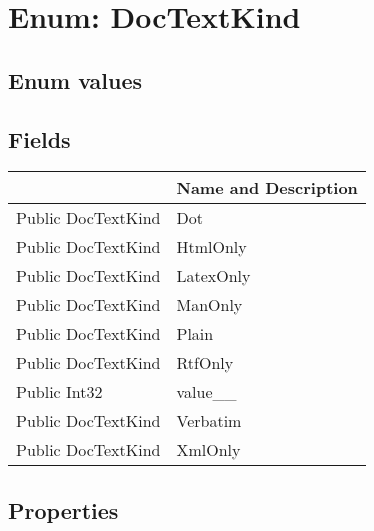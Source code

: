 \documentclass[11pt, oneside, a4paper]{book}
\begin{document}
\section{Enum: DocTextKind}

\subsection{Enum values}

\subsection{Fields}
\begin{center}
\begin{tabular}{| p{3cm} | p{12cm} | }
\hline
\textbf{ } & \textbf{ Name and Description}\\
\hline
 Public  DocTextKind &  Dot\hypertarget{SoftwareEngineeringTools.{}Documentation.{}DocTextKind.{}Dot}{}\\
\hline
 Public  DocTextKind &  HtmlOnly\hypertarget{SoftwareEngineeringTools.{}Documentation.{}DocTextKind.{}HtmlOnly}{}\\
\hline
 Public  DocTextKind &  LatexOnly\hypertarget{SoftwareEngineeringTools.{}Documentation.{}DocTextKind.{}LatexOnly}{}\\
\hline
 Public  DocTextKind &  ManOnly\hypertarget{SoftwareEngineeringTools.{}Documentation.{}DocTextKind.{}ManOnly}{}\\
\hline
 Public  DocTextKind &  Plain\hypertarget{SoftwareEngineeringTools.{}Documentation.{}DocTextKind.{}Plain}{}\\
\hline
 Public  DocTextKind &  RtfOnly\hypertarget{SoftwareEngineeringTools.{}Documentation.{}DocTextKind.{}RtfOnly}{}\\
\hline
 Public  Int32 &  value\_\_\hypertarget{SoftwareEngineeringTools.{}Documentation.{}DocTextKind.{}value\_\_}{}\\
\hline
 Public  DocTextKind &  Verbatim\hypertarget{SoftwareEngineeringTools.{}Documentation.{}DocTextKind.{}Verbatim}{}\\
\hline
 Public  DocTextKind &  XmlOnly\hypertarget{SoftwareEngineeringTools.{}Documentation.{}DocTextKind.{}XmlOnly}{}\\
\hline
\end{tabular}
\end{center}

\subsection{Properties}
\end{document}
